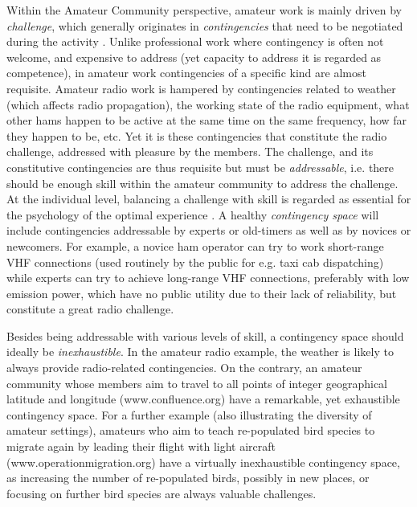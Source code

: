 \documentclass{sig-alt-release2}
\begin{document}
Within the Amateur Community perspective, amateur work is mainly driven by \textit{challenge}, which generally originates in \textit{contingencies} that need to be negotiated during the activity \cite{bogdan_bowers07}. Unlike professional work where contingency is often not welcome, and expensive to address (yet capacity to address it is regarded as competence), in amateur work contingencies of a specific kind are almost requisite. Amateur radio work is hampered by contingencies related to weather (which affects radio propagation), the working state of the radio equipment, what other hams happen to be active at the same time on the same frequency, how far they happen to be, etc. Yet it is these contingencies that constitute the radio challenge, addressed with pleasure by the members. The challenge, and its constitutive contingencies are thus requisite but must be \textit{addressable}, i.e. there should be enough skill within  the amateur community to address the challenge. At the individual level, balancing a challenge with skill is regarded as essential for the psychology of the optimal experience \cite{csik90}. A healthy \textit{contingency space} will include contingencies addressable by experts or old-timers as well as by novices or newcomers. For example, a novice ham operator can try to work short-range VHF connections (used routinely by the public for e.g. taxi cab dispatching)  while experts can try to achieve long-range VHF connections, preferably with low emission power, which have no public utility due to their lack of reliability, but constitute a great radio challenge.  

Besides being addressable with various levels of skill, a contingency space should ideally be \textit{inexhaustible}. In the amateur radio example, the weather is likely to always provide radio-related contingencies. On the contrary, an amateur community whose members aim to travel to all points of integer geographical latitude and longitude (www.confluence.org) have a remarkable, yet exhaustible contingency space. For a further example (also illustrating the diversity of amateur settings), amateurs who aim to teach re-populated bird species to migrate again by leading their flight with light aircraft (www.operationmigration.org) have a virtually inexhaustible contingency space, as increasing the number of re-populated birds, possibly in new places, or focusing on further bird species are always valuable challenges.
\end{document}
